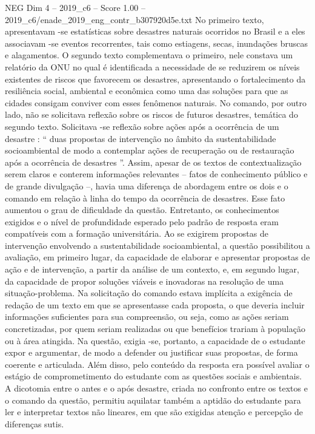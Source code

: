 \begin{textsample}{NEG Dim 4 – 2019\_c6 – Score 1.00 – 2019\_c6/enade\_2019\_eng\_contr\_b307920d5e.txt}
No primeiro texto, apresentavam -se estatísticas sobre desastres naturais ocorridos no Brasil e a eles associavam -se eventos recorrentes, tais como estiagens, secas, inundações bruscas e alagamentos.
O segundo texto complementava o primeiro, nele constava um relatório da ONU no qual é identificada a necessidade de se reduzirem os níveis existentes de riscos que favorecem os desastres, apresentando o fortalecimento da resiliência social, ambiental e econômica como uma das soluções para que as cidades consigam conviver com esses fenômenos naturais.
No comando, por outro lado, não se solicitava reflexão sobre os riscos de futuros desastres, temática do segundo texto.
Solicitava -se reflexão sobre ações após a ocorrência de um desastre : “ duas propostas de intervenção no âmbito da sustentabilidade socioambiental de modo a contemplar ações de recuperação ou de restauração após a ocorrência de desastres ”.
Assim, apesar de os textos de contextualização serem claros e conterem informações relevantes – fatos de conhecimento público e de grande divulgação –, havia uma diferença de abordagem entre os dois e o comando em relação à linha do tempo da ocorrência de desastres.
Esse fato aumentou o grau de dificuldade da questão.
Entretanto, os conhecimentos exigidos e o nível de profundidade esperado pelo padrão de resposta eram compatíveis com a formação universitária.
Ao se exigirem propostas de intervenção envolvendo a sustentabilidade socioambiental, a questão possibilitou a avaliação, em primeiro lugar, da capacidade de elaborar e apresentar propostas de ação e de intervenção, a partir da análise de um contexto, e, em segundo lugar, da capacidade de propor soluções viáveis e inovadoras na resolução de uma situação-problema.
Na solicitação do comando estava implícita a exigência de redação de um texto em que se apresentasse cada proposta, o que deveria incluir informações suficientes para sua compreensão, ou seja, como as ações seriam concretizadas, por quem seriam realizadas ou que benefícios trariam à população ou à área atingida.
Na questão, exigia -se, portanto, a capacidade de o estudante expor e argumentar, de modo a defender ou justificar suas propostas, de forma coerente e articulada.
Além disso, pelo conteúdo da resposta era possível avaliar o estágio de comprometimento do estudante com as questões sociais e ambientais.
A dicotomia entre o antes e o após desastre, criada no confronto entre os textos e o comando da questão, permitiu aquilatar também a aptidão do estudante para ler e interpretar textos não lineares, em que são exigidas atenção e percepção de diferenças sutis.

\end{textsample}
